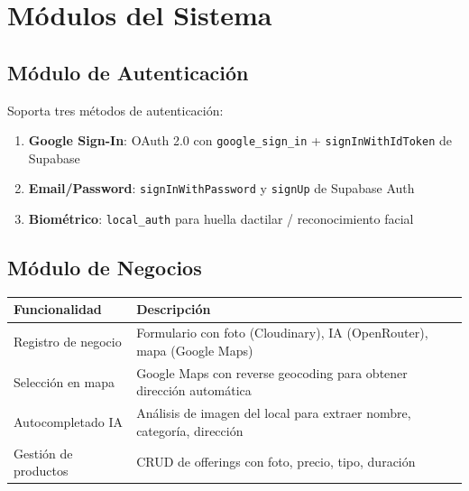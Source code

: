 \documentclass[12pt,a4paper]{article}
\begin{document}
\section{M\'odulos del Sistema}

\subsection{M\'odulo de Autenticaci\'on}

Soporta tres m\'etodos de autenticaci\'on:

\begin{enumerate}
    \item \textbf{Google Sign-In}: OAuth 2.0 con \texttt{google\_sign\_in} + \texttt{signInWithIdToken} de Supabase
    \item \textbf{Email/Password}: \texttt{signInWithPassword} y \texttt{signUp} de Supabase Auth
    \item \textbf{Biom\'etrico}: \texttt{local\_auth} para huella dactilar / reconocimiento facial
\end{enumerate}

\begin{center}
\end{center}

\subsection{M\'odulo de Negocios}

\begin{tabularx}{\textwidth}{lX}
\toprule
\textbf{Funcionalidad} & \textbf{Descripci\'on} \\
\midrule
Registro de negocio & Formulario con foto (Cloudinary), IA (OpenRouter), mapa (Google Maps) \\
Selecci\'on en mapa & Google Maps con reverse geocoding para obtener direcci\'on autom\'atica \\
Autocompletado IA & An\'alisis de imagen del local para extraer nombre, categor\'ia, direcci\'on \\
Gesti\'on de productos & CRUD de offerings con foto, precio, tipo, duraci\'on \\
\bottomrule
\end{tabularx}
\end{document}
